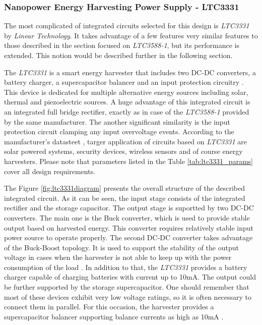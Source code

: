 \documentclass[12pt,a4paper]{article}
\begin{document}
\subsubsection{Nanopower Energy Harvesting Power Supply - LTC3331}
The most complicated of integrated circuits selected for this design is \textit{LTC3331} by \textit{Linear Technology}. It takes advantage of a few features very similar features to those described in the section focused on \textit{LTC3588-1}, but its performance is extended. This notion would be described further in the following section.
\par
The \textit{LTC3331} is a smart energy harvester that includes two DC-DC converters, a battery charger, a supercapacitor balancer and an input protection circuitry \cite{ltc3331_params}. This device is dedicated for multiple alternative energy sources including solar, thermal and piezoelectric sources. A huge advantage of this integrated circuit is an integrated full bridge rectifier, exactly as in case of the \textit{LTC3588-1} provided by the same manufacturer. The another significant similarity is the input protection circuit clamping any input overvoltage events. According to the manufacturer's datasteet \cite{ltc3331_params}, targer application of circuits based on \textit{LTC3331} are solar powered systems, security devices, wireless sensors and of course energy harvesters. Please note that parameters listed in the Table \ref{tab:ltc3331_params} cover all design requirements.\par
The Figure \ref{fig:ltc3331diagram} presents the overall structure of the described integrated circuit. As it can be seen, the input stage consists of the integrated rectifier and the storage capacitor. The output stage is suportted by two DC-DC converters. The main one is the Buck converter, which is used to provide stable output based on harvested energy. This converter requires relatively stable input power source to operate properly. The second DC-DC converter takes advantage of the Buck-Boost topology. It is used to support the stability of the output voltage in cases when the harvester is not able to keep up with the power consumption of the load \cite{ltc3331_params}. In addition to that, the \textit{LTC3331} provides a battery charger capable of charging batteries with current up to 10mA. The output could be further supported by the storage supercapacitor. One should remember that most of these devices exhibit very low voltage ratings, so it is often necessary to connect them in parallel. For this occasion, the harvester provides a supercapacitor balancer supporting balance currents as high as 10mA \cite{ltc3331_params}.
\end{document}
